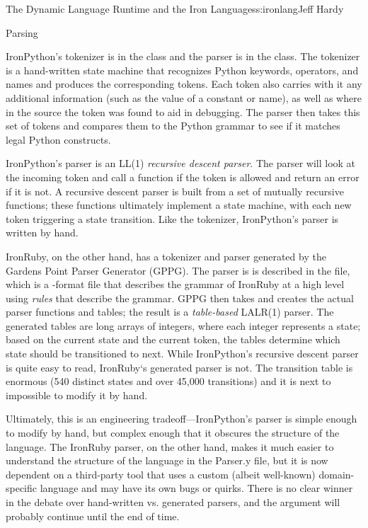 \begin{aosachapter}{The Dynamic Language Runtime and the Iron Languages}{s:ironlang}{Jeff Hardy}
\begin{aosasect1}{Parsing}

IronPython's tokenizer is in the 
class and the parser is in the 
class. The tokenizer is a hand-written state machine that recognizes
Python keywords, operators, and names and produces the corresponding
tokens. Each token also carries with it any additional information
(such as the value of a constant or name), as well as where in the
source the token was found to aid in debugging. The parser then takes
this set of tokens and compares them to the Python grammar to see if
it matches legal Python constructs.

IronPython's parser is an LL(1) \emph{recursive descent parser}. The
parser will look at the incoming token and call a function if the
token is allowed and return an error if it is not. A recursive descent
parser is built from a set of mutually recursive functions; these
functions ultimately implement a state machine, with each new token
triggering a state transition. Like the tokenizer, IronPython's parser
is written by hand.

IronRuby, on the other hand, has a tokenizer and parser generated by
the Gardens Point Parser Generator (GPPG). The parser is is described
in the  file, which is a -format file that
describes the grammar of IronRuby at a high level using \emph{rules}
that describe the grammar. GPPG then takes  and creates
the actual parser functions and tables; the result is a
\emph{table-based} LALR(1) parser. The generated tables are long
arrays of integers, where each integer represents a state; based on
the current state and the current token, the tables determine which
state should be transitioned to next. While IronPython's recursive
descent parser is quite easy to read, IronRuby`s generated parser is
not. The transition table is enormous (540 distinct states and over
45,000 transitions) and it is next to impossible to modify it by hand.

Ultimately, this is an engineering tradeoff---IronPython's parser is
simple enough to modify by hand, but complex enough that it obscures
the structure of the language. The IronRuby parser, on the other hand,
makes it much easier to understand the structure of the language in
the Parser.y file, but it is now dependent on a third-party tool that
uses a custom (albeit well-known) domain-specific language and may
have its own bugs or quirks. There is no clear winner in the debate
over hand-written vs. generated parsers, and the argument will
probably continue until the end of time.


\end{aosasect1}
\end{aosachapter}
